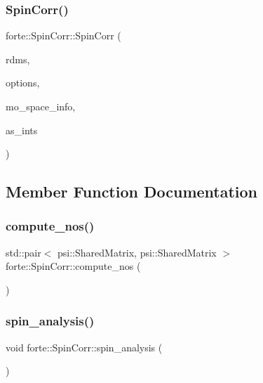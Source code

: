 \subsubsection{\texorpdfstring{Spin\+Corr()}{SpinCorr()}}
{\footnotesize\ttfamily forte\+::\+Spin\+Corr\+::\+Spin\+Corr (\begin{DoxyParamCaption}\item[{\mbox{\hyperlink{classforte_1_1_r_d_ms}{R\+D\+Ms}}}]{rdms,  }\item[{std\+::shared\+\_\+ptr$<$ \mbox{\hyperlink{classforte_1_1_forte_options}{Forte\+Options}} $>$}]{options,  }\item[{std\+::shared\+\_\+ptr$<$ \mbox{\hyperlink{classforte_1_1_m_o_space_info}{M\+O\+Space\+Info}} $>$}]{mo\+\_\+space\+\_\+info,  }\item[{std\+::shared\+\_\+ptr$<$ \mbox{\hyperlink{classforte_1_1_active_space_integrals}{Active\+Space\+Integrals}} $>$}]{as\+\_\+ints }\end{DoxyParamCaption})}



\subsection{Member Function Documentation}
\mbox{\label{classforte_1_1_spin_corr_a7394e555fba8cf3dabeff5c187047cb9}} 
\subsubsection{\texorpdfstring{compute\+\_\+nos()}{compute\_nos()}}
{\footnotesize\ttfamily std\+::pair$<$ psi\+::\+Shared\+Matrix, psi\+::\+Shared\+Matrix $>$ forte\+::\+Spin\+Corr\+::compute\+\_\+nos (\begin{DoxyParamCaption}{ }\end{DoxyParamCaption})}

\mbox{\label{classforte_1_1_spin_corr_ad68819dec9a0cb635550b3d6f90dd5ee}} 
\subsubsection{\texorpdfstring{spin\+\_\+analysis()}{spin\_analysis()}}
{\footnotesize\ttfamily void forte\+::\+Spin\+Corr\+::spin\+\_\+analysis (\begin{DoxyParamCaption}{ }\end{DoxyParamCaption})}



